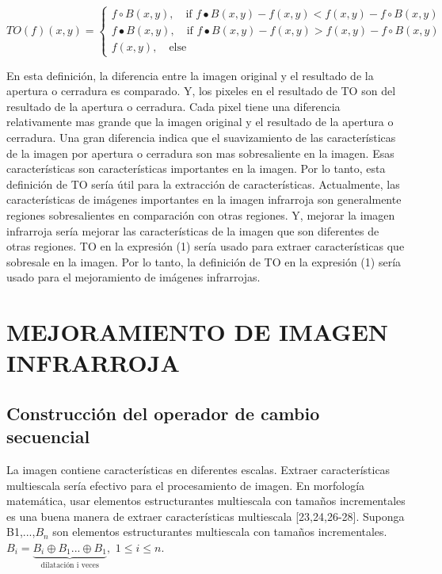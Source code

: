 \documentclass[a4paper, 11 pt, conference]{ieeeconf}      %
\begin{document}
\begin{equation} \label{eq:operadorcambio}
    
 TO(f)(x,y) = 
    \begin{cases}
    f \circ B(x,y), \quad \text{if } f \bullet B(x,y)-f(x,y) < f(x,y)-f \circ B(x,y) \\
     f \bullet B(x,y), \quad \text{if } f \bullet B(x,y)-f(x,y) > f(x,y)-f \circ B(x,y) \\
    f(x,y), \quad \text{else }
    \end{cases}

\end{equation}

En esta definici\'on, la diferencia entre la imagen original y el resultado de la apertura o cerradura es comparado. Y, los pixeles en el resultado de TO son del resultado de la apertura o cerradura. Cada pixel tiene una diferencia relativamente mas grande que la imagen original y el resultado de la apertura o cerradura. Una gran diferencia indica que el suavizamiento de las caracter\'isticas de la imagen por apertura o cerradura son mas sobresaliente en la imagen. Esas caracter\'isticas son caracter\'isticas importantes en la imagen. Por lo tanto, esta definici\'on de TO ser\'ia \'util para la extracci\'on de caracter\'isticas.
Actualmente, las caracter\'isticas de im\'agenes importantes en la imagen infrarroja son generalmente regiones sobresalientes en comparaci\'on con otras regiones. Y, mejorar la imagen infrarroja ser\'ia mejorar las caracter\'isticas de la imagen que son diferentes de otras regiones. TO en la expresi\'on (1) ser\'ia usado para extraer caracter\'isticas que sobresale en la imagen. Por lo tanto, la definici\'on de TO en la expresi\'on (1) ser\'ia usado para el mejoramiento de im\'agenes infrarrojas.

\section{MEJORAMIENTO DE IMAGEN INFRARROJA}

\subsection{Construcci\'on del operador de cambio secuencial} 
La imagen contiene caracter\'isticas en diferentes escalas. Extraer caracter\'isticas multiescala ser\'ia efectivo para el procesamiento de imagen. En morfolog\'ia matem\'atica, usar elementos estructurantes multiescala con tamaños incrementales es una buena manera de extraer caracter\'isticas multiescala [23,24,26-28]. Suponga B1,...,$B_n$ son elementos estructurantes multiescala con tamaños incrementales. $ B_i = \underbrace{B_i \oplus B_1 ... \oplus B_1 }_\text{dilataci\'on i veces}, $ $ 1 \leq i \leq n $. 
\end{document}

